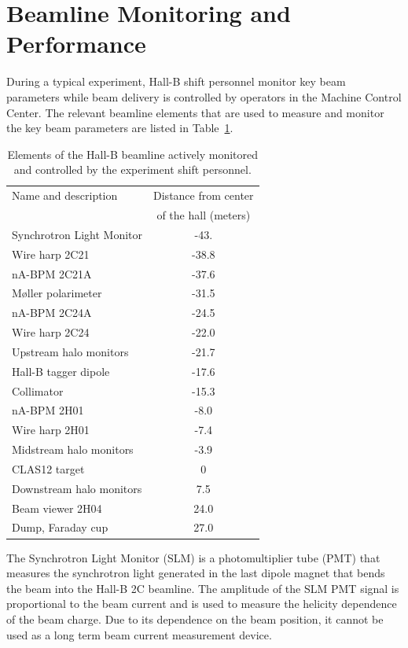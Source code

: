 \section{Beamline Monitoring and Performance}
\label{performance}

During a typical experiment, Hall-B shift personnel monitor key beam parameters while beam delivery is controlled by operators in the 
Machine Control Center. The relevant beamline elements that are used to measure and monitor the key beam parameters are listed 
in Table~\ref{tab:elements}. 


\begin{table}[htp]
\caption{Elements of the Hall-B beamline actively monitored and controlled by the experiment shift personnel.}
\begin{center}
\begin{tabular}{|l|c|}
\hline
Name and description & Distance from center \\
&of the hall (meters) \\  \hline
Synchrotron Light Monitor& -43. \\ 
Wire harp 2C21 & -38.8 \\
nA-BPM 2C21A & -37.6  \\
M{\o}ller polarimeter & -31.5  \\
nA-BPM 2C24A & -24.5  \\
Wire harp 2C24 & -22.0  \\
Upstream halo monitors&-21.7 \\
Hall-B tagger dipole & -17.6  \\ \hline
Collimator & -15.3 \\
nA-BPM 2H01 & -8.0  \\ %
Wire harp 2H01 & -7.4 \\
Midstream halo monitors& -3.9 \\ 
CLAS12 target & 0  \\ \hline
Downstream halo monitors & 7.5 \\
Beam viewer 2H04 & 24.0  \\
Dump, Faraday cup & 27.0  \\
\hline
\end{tabular}
\end{center}
\label{tab:elements}
\end{table}%

The Synchrotron Light Monitor (SLM) is a photomultiplier tube (PMT) that measures the synchrotron light 
generated in the last dipole magnet that bends the beam into the Hall-B 2C beamline.  The amplitude of the SLM PMT signal is 
proportional to the beam current and is used to measure the helicity dependence of the beam charge. Due to its dependence on 
the beam position, it cannot be used as a long term beam current measurement device.


